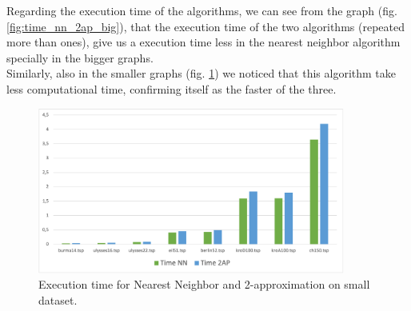 Regarding the execution time of the algorithms, we can see from the graph (fig. \ref{fig:time_nn_2ap_big}), that the execution time of the two algorithms (repeated more than ones), give us a execution time less in the nearest neighbor algorithm specially in the bigger graphs.\\
Similarly, also in the smaller graphs (fig. \ref{fig:time_nn_2ap_small}) we noticed that this algorithm take less computational time, confirming itself as the faster of the three.

\begin{figure}[H]
    \centering
    \includegraphics[width=0.9\textwidth]{./img/time_nn_2ap_small.png}
    \caption{Execution time for Nearest Neighbor and 2-approximation on small dataset.}
    \label{fig:time_nn_2ap_small}
\end{figure}
